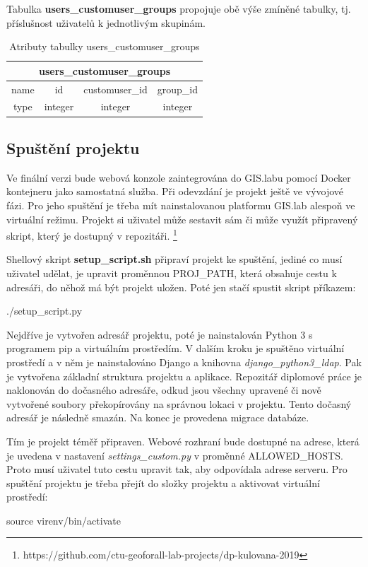 Tabulka \textbf{users\_customuser\_groups} propojuje obě výše zmíněné tabulky, tj. příslušnost uživatelů k jednotlivým skupinám.

\begin{table}[H]
\centering
\begin{tabular}{@{}|c|c|c|c|@{}}
\toprule
\multicolumn{4}{|c|}{users\_customuser\_groups} \\ \midrule
name & id & customuser\_id & group\_id \\ \midrule
type & integer & integer & integer \\ \bottomrule
\end{tabular}
\caption{Atributy tabulky users\_customuser\_groups}
\label{tab:users-customuser-groups}
\end{table}

\subsection{Spuštění projektu}
Ve finální verzi bude webová konzole zaintegrována do GIS.labu pomocí Docker kontejneru jako samostatná služba. Při odevzdání je projekt ještě ve vývojové fázi. Pro jeho spuštění je třeba mít nainstalovanou platformu GIS.lab alespoň ve virtuální režimu. Projekt si uživatel může sestavit sám či může využít připravený skript, který je dostupný v repozitáři. \footnote{https://github.com/ctu-geoforall-lab-projects/dp-kulovana-2019}

Shellový skript \textbf{setup\_script.sh} připraví projekt ke spuštění, jediné co musí uživatel udělat, je upravit proměnnou \textsf{PROJ\_PATH}, která obsahuje cestu k adresáři, do něhož má být projekt uložen. Poté jen stačí spustit skript příkazem:
\begin{center}
\textsf{./setup\_script.py}
\end{center}
Nejdříve je vytvořen adresář projektu, poté je nainstalován Python 3 s programem pip a virtuálním prostředím. V dalším kroku je spuštěno virtuální prostředí a v něm je nainstalováno Django a knihovna \textit{django\_python3\_ldap}. Pak je vytvořena základní struktura projektu a aplikace. Repozitář diplomové práce je naklonován do dočasného adresáře, odkud jsou všechny upravené či nově vytvořené soubory překopírovány na správnou lokaci v projektu. Tento dočasný adresář je následně smazán. Na konec je provedena migrace databáze.

Tím je projekt téměř připraven. Webové rozhraní bude dostupné na adrese, která je uvedena v nastavení \textit{settings\_custom.py} v proměnné \textsf{ALLOWED\_HOSTS}. Proto musí uživatel tuto cestu upravit tak, aby odpovídala adrese serveru. Pro spuštění projektu je třeba přejít do složky projektu a aktivovat virtuální prostředí:
\begin{center}
\textsf{source virenv/bin/activate}
\end{center}

